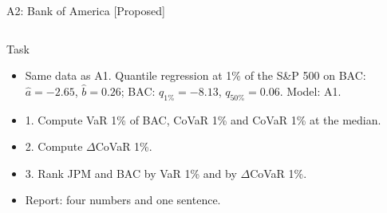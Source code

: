 \begin{frame}{A2: Bank of America [Proposed]}
\propsub
\itemsize{\scriptsize}
\begin{columns}[T]
\begin{column}{\taskw}
\begin{block}{Task}
\begin{itemize}
    \item Same data as A1. Quantile regression at 1\% of the S\&P 500 on BAC: $\hat a = -2.65$, $\hat b = 0.26$; BAC: $q_{1\%} = -8.13$, $q_{50\%} = 0.06$. Model: A1.
    \item 1. Compute VaR 1\% of BAC, CoVaR 1\% and CoVaR 1\% at the median.
    \item 2. Compute $\Delta$CoVaR 1\%.
    \item 3. Rank JPM and BAC by VaR 1\% and by $\Delta$CoVaR 1\%.
    \item Report: four numbers and one sentence.
\end{itemize}
\end{block}
\end{column}
\begin{column}{\solw}
\end{column}
\end{columns}
\end{frame}

